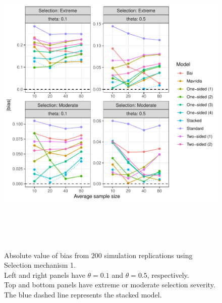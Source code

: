 \documentclass[12pt]{article}   	%
\numberwithin{equation}{section}
\begin{document}
\begin{figure}
\includegraphics[height = 6in, width = 6.5in]{sim1_plot_bias.pdf}
\caption{Absolute value of bias from 200 simulation replications using Selection mechanism 1. \\
	      Left and right panels have $\theta=0.1$ and $\theta = 0.5$, respectively. \\
	      Top and bottom panels have extreme or moderate selection severity. \\
	      The blue dashed line represents the stacked model.}
\label{fig:sim1_plot_bias}
\end{figure}
\end{document}
